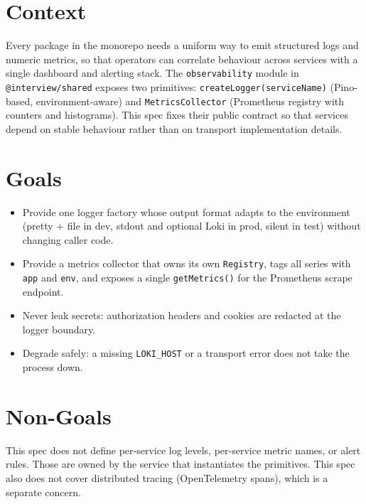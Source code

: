 




\makespecheader

\section{Context}
Every package in the monorepo needs a uniform way to emit structured logs and numeric metrics, so that operators can correlate behaviour across services with a single dashboard and alerting stack. The \texttt{observability} module in \texttt{@interview/shared} exposes two primitives: \texttt{createLogger(serviceName)} (Pino-based, environment-aware) and \texttt{MetricsCollector} (Prometheus registry with counters and histograms). This spec fixes their public contract so that services depend on stable behaviour rather than on transport implementation details.

\section{Goals}
\begin{itemize}[leftmargin=1.2em]
  \item Provide one logger factory whose output format adapts to the environment (pretty + file in dev, stdout and optional Loki in prod, silent in test) without changing caller code.
  \item Provide a metrics collector that owns its own \texttt{Registry}, tags all series with \texttt{app} and \texttt{env}, and exposes a single \texttt{getMetrics()} for the Prometheus scrape endpoint.
  \item Never leak secrets: authorization headers and cookies are redacted at the logger boundary.
  \item Degrade safely: a missing \texttt{LOKI\_HOST} or a transport error does not take the process down.
\end{itemize}

\section{Non-Goals}
\begin{nongoal}
This spec does not define per-service log levels, per-service metric names, or alert rules. Those are owned by the service that instantiates the primitives. This spec also does not cover distributed tracing (OpenTelemetry spans), which is a separate concern.
\end{nongoal}

